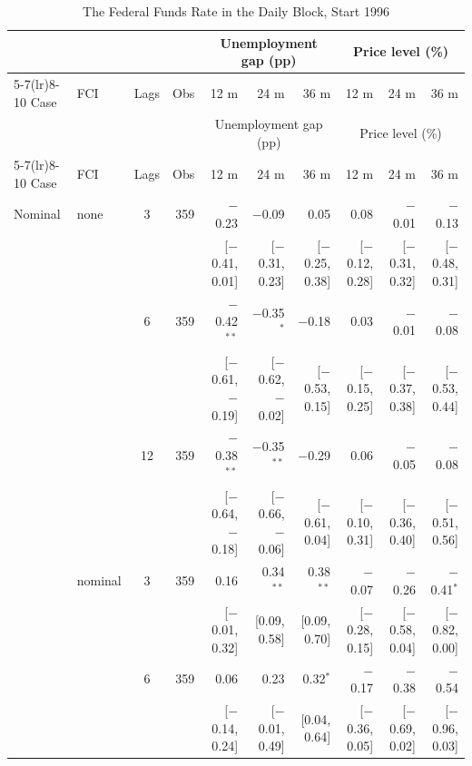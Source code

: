 \begingroup\scriptsize\setlength{\tabcolsep}{0.9pt}
\begin{longtable}{llcrrrrrrr}
\caption{The Federal Funds Rate in the Daily Block, Start 1996}\label{tab:appR8}\\
\toprule
 & & & & \multicolumn{3}{c}{Unemployment gap (pp)} & \multicolumn{3}{c}{Price level (\%)}\\ \cmidrule(lr){5-7}\cmidrule(lr){8-10}
Case & FCI & Lags & Obs & 12 m & 24 m & 36 m & 12 m & 24 m & 36 m\\
\midrule\endfirsthead
\toprule
 & & & & \multicolumn{3}{c}{Unemployment gap (pp)} & \multicolumn{3}{c}{Price level (\%)}\\ \cmidrule(lr){5-7}\cmidrule(lr){8-10}
Case & FCI & Lags & Obs & 12 m & 24 m & 36 m & 12 m & 24 m & 36 m\\
\midrule\endhead
\bottomrule\endfoot
Nominal & none & 3 & 359 & $-$0.23 & $-$0.09 & 0.05 & 0.08 & $-$0.01 & $-$0.13\\
 & & & & {\scriptsize [$-$0.41, 0.01]} & {\scriptsize [$-$0.31, 0.23]} & {\scriptsize [$-$0.25, 0.38]} & {\scriptsize [$-$0.12, 0.28]} & {\scriptsize [$-$0.31, 0.32]} & {\scriptsize [$-$0.48, 0.31]}\\
 &  & 6 & 359 & $-$0.42$^{**}$ & $-$0.35$^{*}$ & $-$0.18 & 0.03 & $-$0.01 & $-$0.08\\
 & & & & {\scriptsize [$-$0.61, $-$0.19]} & {\scriptsize [$-$0.62, $-$0.02]} & {\scriptsize [$-$0.53, 0.15]} & {\scriptsize [$-$0.15, 0.25]} & {\scriptsize [$-$0.37, 0.38]} & {\scriptsize [$-$0.53, 0.44]}\\
 &  & 12 & 359 & $-$0.38$^{**}$ & $-$0.35$^{**}$ & $-$0.29 & 0.06 & $-$0.05 & $-$0.08\\
 & & & & {\scriptsize [$-$0.64, $-$0.18]} & {\scriptsize [$-$0.66, $-$0.06]} & {\scriptsize [$-$0.61, 0.04]} & {\scriptsize [$-$0.10, 0.31]} & {\scriptsize [$-$0.36, 0.40]} & {\scriptsize [$-$0.51, 0.56]}\\
 & nominal & 3 & 359 & 0.16 & 0.34$^{**}$ & 0.38$^{**}$ & $-$0.07 & $-$0.26 & $-$0.41$^{*}$\\
 & & & & {\scriptsize [$-$0.01, 0.32]} & {\scriptsize [0.09, 0.58]} & {\scriptsize [0.09, 0.70]} & {\scriptsize [$-$0.28, 0.15]} & {\scriptsize [$-$0.58, 0.04]} & {\scriptsize [$-$0.82, 0.00]}\\
 &  & 6 & 359 & 0.06 & 0.23 & 0.32$^{*}$ & $-$0.17 & $-$0.38 & $-$0.54\\
 & & & & {\scriptsize [$-$0.14, 0.24]} & {\scriptsize [$-$0.01, 0.49]} & {\scriptsize [0.04, 0.64]} & {\scriptsize [$-$0.36, 0.05]} & {\scriptsize [$-$0.69, 0.02]} & {\scriptsize [$-$0.96, 0.03]}\\

\end{longtable}
